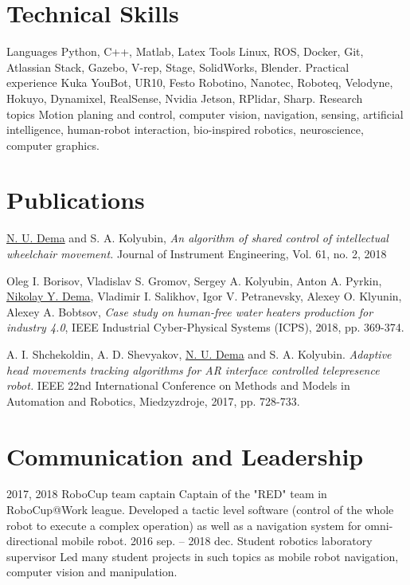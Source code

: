 \documentclass{ncv}
\begin{document}
\section{Technical Skills}
\begin{two_col_entry_list}
	\entry
		{Languages}
		{Python, C++, Matlab, Latex}
	\entry
		{Tools}
		{Linux, ROS, Docker, Git, Atlassian Stack, Gazebo, V-rep, Stage, SolidWorks, Blender.}
	\entry
		{Practical\\ experience}
		{
		Kuka YouBot, UR10, Festo Robotino, Nanotec, Roboteq, Velodyne, Hokuyo, Dynamixel, RealSense, Nvidia Jetson, RPlidar, Sharp.}
	\entry
		{Research\\ topics}
		{Motion planing and control, computer vision, navigation, sensing, artificial intelligence, human-robot interaction, bio-inspired robotics, neuroscience, computer graphics.}
\end{two_col_entry_list}


\section{Publications}
	\begin{pub_itemize}
        \item \underline{N. U. Dema} and S. A. Kolyubin, \textit{An algorithm of shared control of intellectual wheelchair movement.} Journal of Instrument Engineering, Vol. 61, no. 2, 2018
            
        \item Oleg I. Borisov, Vladislav S. Gromov, Sergey A. Kolyubin, Anton A. Pyrkin, \underline{Nikolay Y. Dema}, Vladimir I. Salikhov, Igor V. Petranevsky, Alexey O. Klyunin,  Alexey A. Bobtsov, \textit{Case study on human-free water heaters production for industry 4.0}, IEEE Industrial Cyber-Physical Systems (ICPS), 2018, pp. 369-374.
            
        \item A. I. Shchekoldin, A. D. Shevyakov, \underline{N. U. Dema} and S. A. Kolyubin. \textit{Adaptive head movements tracking algorithms for AR interface controlled telepresence robot.} IEEE 22nd International Conference on Methods and Models in Automation and Robotics, Miedzyzdroje, 2017, pp. 728-733.
    \end{pub_itemize}
         
         
\section{Communication and Leadership}
\begin{two_col_entry_list}
    \entryhc
		{2017, 2018}
		{RoboCup team captain}
		{}
		{Captain of the "RED" team in RoboCup@Work league. Developed a tactic level software (control of the whole robot to execute a complex operation) as well as a navigation system for omni-directional mobile robot.}
    \entryhc
		{2016 sep. -- 2018 dec.}
		{Student robotics laboratory supervisor}
		{}
		{Led many student projects in such topics as mobile robot navigation, computer vision and manipulation.}
\end{two_col_entry_list}
\end{document}
